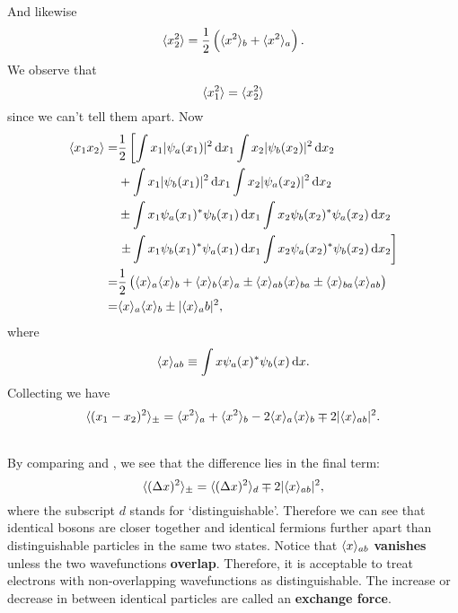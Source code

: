 And likewise
\begin{equation}
\langle x_2^2\rangle=\frac{1}{2}\left(\langle x^2\rangle_b+\langle x^2\rangle_a\right).
\end{equation}
We observe that 
\begin{equation}
\langle x_1^2\rangle=\langle x_2^2\rangle
\end{equation}
since we can't tell them apart. Now
\begin{equation}
\begin{aligned}
\lgl x_1x_2\rgl=&\frac{1}{2}\lf[\int x_1|\psi_a(x_1)|^2\dx_1\int x_2|\psi_b(x_2)|^2\dx_2\rt.\\
&+\int x_1|\psi_b(x_1)|^2\dx_1\int x_2|\psi_a(x_2)|^2\dx_2\\
&\pm\int x_1\psi_a(x_1)^*\psi_b(x_1)\dx_1\int x_2\psi_b(x_2)^*\psi_a(x_2)\dx_2\\
&\lf.\pm\int x_1\psi_b(x_1)^*\psi_a(x_1)\dx_1\int x_2\psi_a(x_2)^*\psi_b(x_2)\dx_2 \rt]\\
=&\frac{1}{2}\lf(\lgl x\rgl_a \lgl x\rgl_b+\lgl x\rgl_b \lgl x\rgl_a\pm\lgl x\rgl_{ab} \lgl x\rgl_{ba}\pm \lgl x\rgl_{ba} \lgl x\rgl_{ab} \rt)\\
=&\lgl x\rgl_{a} \lgl x\rgl_{b}\pm|\lgl x\rgl_ab|^2, 
\end{aligned}
\end{equation}
where 
\begin{equation}
\lgl x\rgl_{ab}\equiv\int x\psi_a(x)^*\psi_b(x)\dx.
\end{equation}
Collecting we have
\begin{equation}
\label{delx_iden}
\langle (x_1-x_2)^2\rangle_{\pm}=\langle x^2\rangle_a+\langle x^2\rangle_b-2 \langle x\rangle_a \langle x\rangle_b\mp2 |\langle x\rangle_{ab}|^2.
\end{equation}
\begin{thrm}
\ \\
By comparing  and , we see that the difference 
lies in the final term:
\begin{equation}
\langle (\Delta x)^2\rangle_{\pm}=\langle (\Delta x)^2\rangle_d\mp2 |\langle x\rangle_{ab}|^2,
\end{equation}
where the subscript $d$ stands for `distinguishable'. 
Therefore we can see that identical bosons are closer together and identical 
fermions further apart than distinguishable particles in the same two states. 
Notice that $\langle x\rangle_{ab}$ \textbf{vanishes} unless the two wavefunctions 
\textbf{overlap}. Therefore, it is acceptable to treat electrons with 
non-overlapping wavefunctions as distinguishable. The increase or decrease 
in between identical particles are called an \textbf{exchange force}.
\end{thrm}
